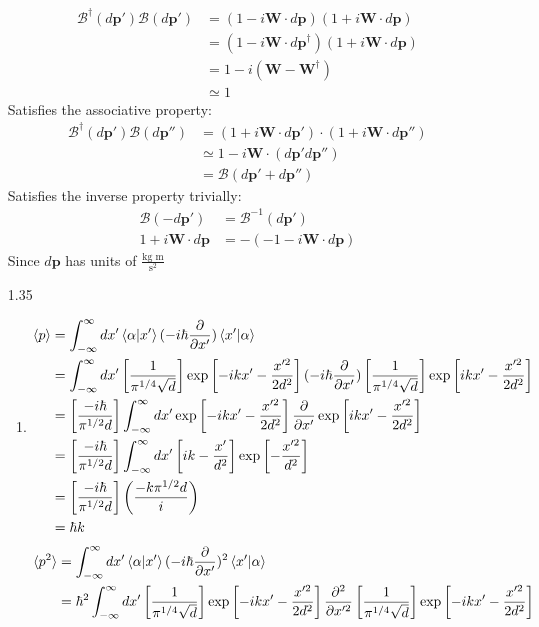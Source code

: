 \documentclass[12pt]{article}
\newcommand{\opp}{\pmb{\text{p}}}
\newcommand{\boost}{\mathscr{B}(d\opp')}
\newcommand{\boostdag}{\mathscr{B}^{\dag}(d\opp')}
\newcommand{\opw}{\pmb{\text{W}}}
\newcommand{\p}[2]{\frac{\partial #1}{\partial #2}}
\begin{document}
\begin{enumerate}
\begin{align*}
      \boostdag\boost&=(1-i\opw\cdot d\opp)(1+i\opw\cdot d\opp)\\
      &=(1-i\opw\cdot d\opp^{\dagger})(1+i\opw\cdot d\opp)\\
      &=1-i(\opw-\opw^{\dagger})\\
      &\simeq 1
    \end{align*}
    Satisfies the associative property:
    \begin{align*}
      \boostdag\mathscr{B}(d\opp'')&=(1+i\opw\cdot d\opp')\cdot(1+i\opw\cdot d\opp'')\\
      &\simeq 1-i\opw\cdot(d\opp' d\opp'')\\
      &= \mathscr{B}(d\opp'+d\opp'')
    \end{align*}
    Satisfies the inverse property trivially:
    \begin{align*}
      \mathscr{B}(-d\opp')&=\mathscr{B}^{-1}(d\opp')\\
      1+i\opw\cdot d\opp&=-(-1-i\opw\cdot d\opp)
    \end{align*}
    Since $d\opp$ has units of $\frac{\text{kg m}}{\text{s}^2}$
    \item[1.35]
    \begin{enumerate}
      \item
      \begin{align*}
        \braket{p}&=\int_{-\infty}^{\infty}dx'\braket{\alpha|x'}(-i\hbar\p{}{x'})\braket{x'|\alpha}\\
        &=\int_{-\infty}^{\infty}dx'\left[\frac{1}{\pi^{1/4}\sqrt{d}}\right]\exp\left[-ikx'-\frac{x'^2}{2d^2}\right](-i\hbar\p{}{x'})\left[\frac{1}{\pi^{1/4}\sqrt{d}}\right]\exp\left[ikx'-\frac{x'^2}{2d^2}\right]\\
        &=\left[\frac{-i\hbar}{\pi^{1/2}d}\right]\int_{-\infty}^{\infty}dx'\exp\left[-ikx'-\frac{x'^2}{2d^2}\right]\p{}{x'}\exp\left[ikx'-\frac{x'^2}{2d^2}\right]\\
        &=\left[\frac{-i\hbar}{\pi^{1/2}d}\right]\int_{-\infty}^{\infty}dx'\left[ ik-\frac{x'}{d^2} \right]\exp\left[-\frac{x'^2}{d^2}\right]\\
        &=\left[\frac{-i\hbar}{\pi^{1/2}d}\right]\left(\frac{-k\pi^{1/2}d}{i}\right)\\
        &=\hbar k
      \end{align*}
      \begin{align*}
        \braket{p^2}&=\int_{-\infty}^{\infty}dx'\braket{\alpha|x'}(-i\hbar\p{}{x'})^2\braket{x'|\alpha}\\
        &=\hbar^2\int_{-\infty}^{\infty}dx'\left[\frac{1}{\pi^{1/4}\sqrt{d}}\right]\exp\left[-ikx'-\frac{x'^2}{2d^2}\right]\p{^2}{x'^2}\left[\frac{1}{\pi^{1/4}\sqrt{d}}\right]\exp\left[-ikx'-\frac{x'^2}{2d^2}\right]\\

\end{align*}
\end{enumerate}
\end{enumerate}
\end{document}
